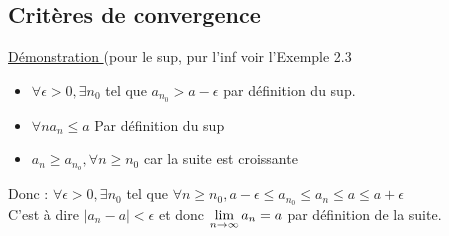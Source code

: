 \documentclass[12pt,a4paper]{article}
\begin{document}
{\subsection{Critères de convergence}
\begin{center}
\end{center}
\begin{center}
\end{center}
\underline{Démonstration }(pour le sup, pur l'inf voir l'Exemple 2.3\\
\begin{itemize}
\item $\forall \epsilon > 0, \exists n_0$ tel que $a_{n_0} > a-\epsilon$ par définition du sup.
\item $\forall n a_n \leq a$ Par définition du sup
\item$a_n \geq a_{n_o}, \forall n \geq n_0$ car la suite est croissante
\end{itemize}
Donc : $ \forall \epsilon > 0, \exists n_0$ tel que $\forall n \geq n_0, a-\epsilon \leq a_{n_0} \leq a_n \leq a \leq a + \epsilon$\\
C'est à dire $|a_n-a| < \epsilon$ et donc $\lim\limits_{n \to \infty} a_n =a$ par définition de la suite.

}
\end{document}
